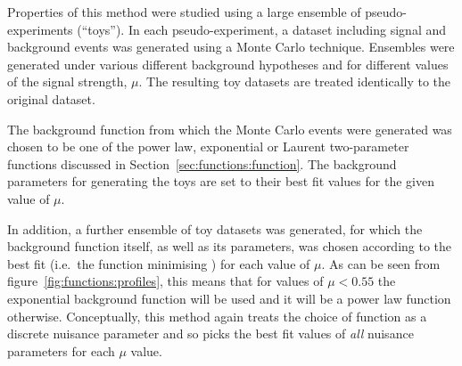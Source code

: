 Properties of this method were studied
using a large ensemble of
pseudo-experiments (``toys''). In each pseudo-experiment, a
dataset including signal and background events was generated using a Monte Carlo technique.
Ensembles were generated %
under various different background hypotheses and for different values of the signal strength, $\mu$.
The resulting toy datasets are treated identically to the original dataset.

The background function from which the Monte Carlo events were generated was chosen to be one of the power law,
exponential or Laurent two-parameter functions discussed in
Section~\ref{sec:functions:function}. The background parameters for generating the toys are set to their best fit values for the given value of $\mu$.

In addition, a further ensemble of toy datasets was generated, for which the background function itself, as well
as its parameters, was chosen according to the best fit (i.e.~the function minimising \nll) for each value of $\mu$.
As can be seen from figure~\ref{fig:functions:profiles}, this means that for values of $\mu < 0.55$ the exponential background
function will be used and it will be a power law function otherwise.
Conceptually, this method again
treats the choice of function as a discrete nuisance parameter and so picks the
best fit values of {\em all\/} nuisance parameters for each $\mu$ value.


